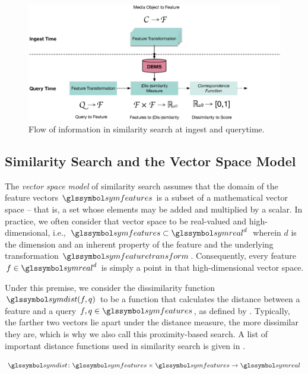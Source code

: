 \begin{figure}[tb]
    \centering
    \includegraphics[width=\textwidth]{figures/multimedia-retrieval-pipeline}
    \caption{Flow of information in similarity search at ingest and querytime.}
    \label{figure:multimedia_retrieval_flow}
\end{figure}

\subsection{Similarity Search and the Vector Space Model}

The \emph{vector space model} of similarity search \cite{Salton:1975Vector} assumes that the domain of the feature vectors $\symfeatures$ is a subset of a mathematical vector space -- that is, a set whose elements may be added and multiplied by a scalar. In practice, we often consider that vector space to be real-valued and high-dimensional, i.e., $\symfeatures \subset \symreal^{d}$ wherein $d$ is the dimension and an inherent property of the feature and the underlying transformation $\symfeaturetransform$. Consequently, every feature $f \in \symreal^{d}$ is simply a point in that high-dimensional vector space.

Under this premise, we consider the dissimilarity function $\symdist(f,q)$ to be a function that calculates the distance between a feature and a query $f,q \in \symfeatures$, as defined by . Typically, the farther two vectors lie apart under the distance measure, the more dissimilar they are, which is why we also call this proximity-based search. A list of important distance functions used in similarity search is given in . 

\begin{equation}
    \label{eq:distance_function}
    \symdist \colon \symfeatures \times \symfeatures \rightarrow \symreal
\end{equation}


